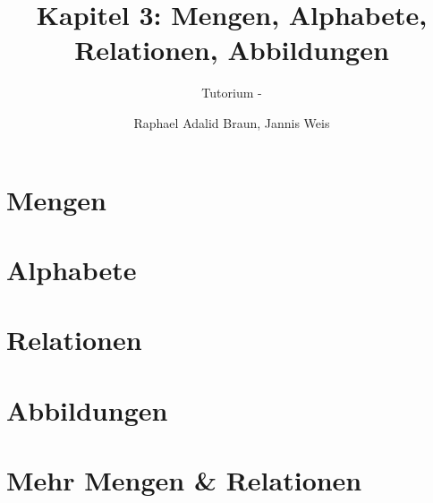 \documentclass[18pt]{beamer}
\title[Mengen, Alphabete...]{Kapitel 3: Mengen, Alphabete, Relationen, Abbildungen}
\subtitle{Tutorium - } %
\author{Raphael Adalid Braun, Jannis Weis}
\institute{Grundbegriffe der Informatik | WS 2018/19}
\begin{document}

\begin{frame}
 \titlepage
\end{frame}

\def\showSolutions{1}					 %

\section{Mengen}
\title[Mengen]{}

\section{Alphabete}
\title[Alphabete]{}

\section{Relationen}
\title[Relationen]{}

\section{Abbildungen}
\title[Abbildungen]{}

\section{Mehr Mengen & Relationen}
\title[Mehr Mengen & Relationen]{}

\end{document}
